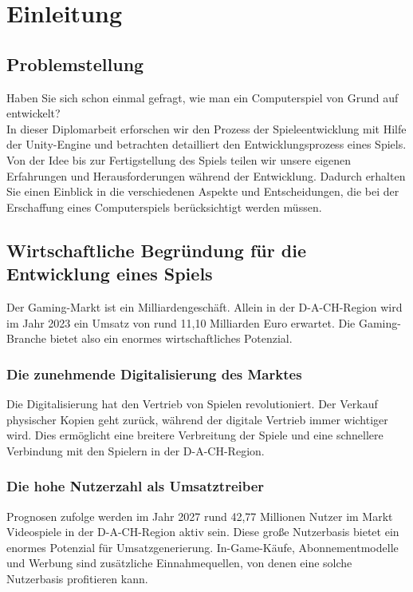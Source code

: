 \chapter{Einleitung}

\section{Problemstellung}
Haben Sie sich schon einmal gefragt, wie man ein Computerspiel von Grund auf entwickelt?
\\ In dieser Diplomarbeit erforschen wir den Prozess der Spieleentwicklung mit Hilfe der Unity-Engine und betrachten detailliert den Entwicklungsprozess eines Spiels. Von der Idee bis zur Fertigstellung des Spiels teilen wir unsere eigenen Erfahrungen und Herausforderungen während der Entwicklung. Dadurch erhalten Sie einen Einblick in die verschiedenen Aspekte und Entscheidungen, die bei der Erschaffung eines Computerspiels berücksichtigt werden müssen.

\section{Wirtschaftliche Begründung für die Entwicklung eines Spiels}
Der Gaming-Markt ist ein Milliardengeschäft. Allein in der D-A-CH-Region wird im Jahr 2023 ein Umsatz von rund 11,10 Milliarden Euro erwartet. Die Gaming-Branche bietet also ein enormes wirtschaftliches Potenzial.

\subsection{Die zunehmende Digitalisierung des Marktes}
Die Digitalisierung hat den Vertrieb von Spielen revolutioniert. Der Verkauf physischer Kopien geht zurück, während der digitale Vertrieb immer wichtiger wird. Dies ermöglicht eine breitere Verbreitung der Spiele und eine schnellere Verbindung mit den Spielern in der D-A-CH-Region.

\subsection{Die hohe Nutzerzahl als Umsatztreiber}
Prognosen zufolge werden im Jahr 2027 rund 42,77 Millionen Nutzer im Markt Videospiele in der D-A-CH-Region aktiv sein. Diese große Nutzerbasis bietet ein enormes Potenzial für Umsatzgenerierung. In-Game-Käufe, Abonnementmodelle und Werbung sind zusätzliche Einnahmequellen, von denen eine solche Nutzerbasis profitieren kann.

